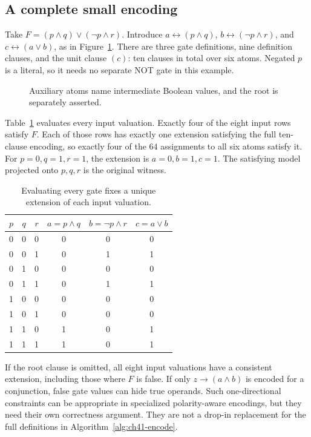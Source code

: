 \subsection{A complete small encoding}
\label{sec:ch41-encoding-example}

Take $F=(p\land q)\lor(\neg p\land r)$.
Introduce $a\leftrightarrow(p\land q)$, $b\leftrightarrow(\neg p\land r)$, and $c\leftrightarrow(a\lor b)$, as in Figure~\ref{fig:ch41-gates}.
There are three gate definitions, nine definition clauses, and the unit clause $(c)$: ten clauses in total over six atoms.
Negated $p$ is a literal, so it needs no separate NOT gate in this example.

\begin{figure}
\centering

\caption{Auxiliary atoms name intermediate Boolean values, and the root is separately asserted.}
\label{fig:ch41-gates}
\end{figure}

Table~\ref{tab:ch41-gate-values} evaluates every input valuation.
Exactly four of the eight input rows satisfy $F$.
Each of those rows has exactly one extension satisfying the full ten-clause encoding, so exactly four of the $64$ assignments to all six atoms satisfy it.
For $p=0,q=1,r=1$, the extension is $a=0,b=1,c=1$.
The satisfying model projected onto $p,q,r$ is the original witness.

\begin{table}
\caption{Evaluating every gate fixes a unique extension of each input valuation.}
\label{tab:ch41-gate-values}
\centering
\begin{tabular}{cccccc}
\toprule
$p$ & $q$ & $r$ & $a=p\land q$ & $b=\neg p\land r$ & $c=a\lor b$ \\
\midrule
0 & 0 & 0 & 0 & 0 & 0 \\
0 & 0 & 1 & 0 & 1 & 1 \\
0 & 1 & 0 & 0 & 0 & 0 \\
0 & 1 & 1 & 0 & 1 & 1 \\
1 & 0 & 0 & 0 & 0 & 0 \\
1 & 0 & 1 & 0 & 0 & 0 \\
1 & 1 & 0 & 1 & 0 & 1 \\
1 & 1 & 1 & 1 & 0 & 1 \\
\bottomrule
\end{tabular}
\end{table}

If the root clause is omitted, all eight input valuations have a consistent extension, including those where $F$ is false.
If only $z\rightarrow(a\land b)$ is encoded for a conjunction, false gate values can hide true operands.
Such one-directional constraints can be appropriate in specialized polarity-aware encodings, but they need their own correctness argument.
They are not a drop-in replacement for the full definitions in Algorithm~\ref{alg:ch41-encode}.

